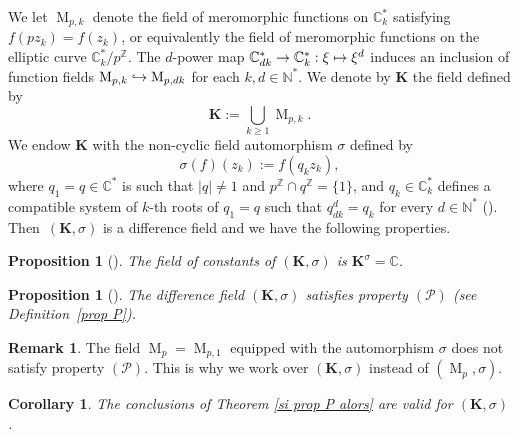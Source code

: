 \documentclass[10pt]{amsart}
\let\mathcal\mathscr
\newcommand\mto{\mathchoice{\longmapsto}{\mapsto}{\mapsto}{\mapsto}}
\newcommand\hto{\mathrel{\lhook\joinrel\to}}
\newtheorem{prop}[theo]{Proposition}
\newtheorem{coro}[theo]{Corollary}
\theoremstyle{definition}
\newtheorem{remark}[theo]{Remark}
\newcommand{\N}{\mathbb N}
\newcommand{\Z}{\mathbb Z}
\newcommand{\C}{\mathbb C}
\newcommand\K{\boldsymbol{K}}
\let\s\sigma
\newcommand{\propP}{(\mathcal{P})}
\newcommand{\mero}{\operatorname{M}}
\begin{document}
We let $\mero_{p,k}$ denote the field of meromorphic functions on $\C^{*}_k$ satisfying $f(pz_k)=f(z_k)$, or equivalently the field of meromorphic functions on the elliptic curve $\C^{*}_k/p^\Z$. The $d$-power map $\C^{*}_{dk}\to \C^{*}_k:\xi\mto \xi^d$ induces an inclusion of function fields $\mero_{p,k}\hto\mero_{p,dk}$ for each $k,d\in\N^{*}$. We denote by $\K$ the field defined by
\[
\K:=
\bigcup_{k \geq 1} \mero_{p,k}.
\]
We endow $\K$ with the non-cyclic field automorphism
$\s$ defined by
\begin{equation}\label{sigma-def}
\s (f)(z_k):=f(q_kz_k),
\end{equation}
where $q_1=q\in \C^{*}$ is such that $\vert q \vert \neq 1$ and $p^{\Z} \cap q^{\Z}=\{1\}$, and $q_k\in\C^{*}_k$ defines a compatible system of $k$-th roots of $q_1=q$ such that $q_{dk}^d=q_k$ for every $d\in\N^{*}$ (\cf \cite[\S 2]{Hen97}).
Then~$(\K,\s)$ is a difference field and we have the following properties.

\begin{prop}[{\cite[Prop.\,5]{dreyfus2015galois}}]
The field of constants of $(\K,\s)$ is
\hbox{$\K^{\s}=\C$}.
\end{prop}

\begin{prop}[{\cite[Prop.\,6]{dreyfus2015galois}}]
The difference field $(\K,\s)$ satisfies property $\propP$ (see Definition~\ref{prop P}).
\end{prop}

\begin{remark}
The field $\mero_{p}=\mero_{p,1}$ equipped with the automorphism $\s$ does not satisfy property $\propP$. This is why we work over $(\K,\s)$ instead of $(\mero_{p},\s)$.
\end{remark}

\begin{coro}\label{coro1}
The conclusions of Theorem \ref{si prop P alors} are valid for $(\K,\s)$.
\end{coro}
\end{document}
